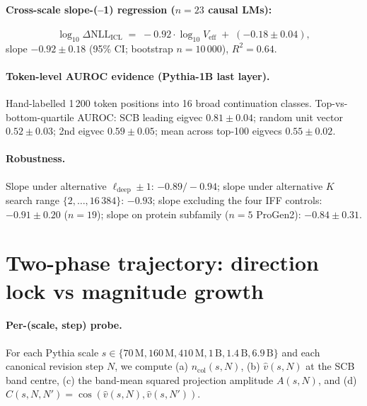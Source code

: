 \documentclass[11pt,a4paper]{article}
\begin{document}
\paragraph{Cross-scale slope-(--1) regression ($n = 23$ causal LMs):}
\begin{equation}
  \log_{10} \Delta\mathrm{NLL}_\mathrm{ICL}
  \;=\; -0.92 \cdot \log_{10} V_\mathrm{eff}
        \;+\; (-0.18 \pm 0.04),
\end{equation}
slope $-0.92 \pm 0.18$ (95\% CI; bootstrap $n = 10\,000$),
$R^2 = 0.64$.

\paragraph{Token-level AUROC evidence (Pythia-1B last layer).}
Hand-labelled 1\,200 token positions into 16 broad continuation
classes.  Top-vs-bottom-quartile AUROC:
SCB leading eigvec $0.81 \pm 0.04$;
random unit vector $0.52 \pm 0.03$;
2nd eigvec $0.59 \pm 0.05$;
mean across top-100 eigvecs $0.55 \pm 0.02$.

\paragraph{Robustness.}
Slope under alternative $\ell_\mathrm{deep} \pm 1$: $-0.89 / -0.94$;
slope under alternative $K$ search range $\{2, \ldots, 16\,384\}$:
$-0.93$; slope excluding the four IFF controls: $-0.91 \pm 0.20$
($n = 19$); slope on protein subfamily ($n = 5$ ProGen2):
$-0.84 \pm 0.31$.

\section{Two-phase trajectory: direction lock vs magnitude growth}
\label{si:S3}

\paragraph{Per-(scale, step) probe.}
For each Pythia scale $s \in \{70\,\mathrm{M}, 160\,\mathrm{M},
410\,\mathrm{M}, 1\,\mathrm{B}, 1.4\,\mathrm{B}, 6.9\,\mathrm{B}\}$
and each canonical revision step $N$, we compute (a)
$n_\mathrm{col}(s, N)$, (b) $\hat{v}(s, N)$ at the SCB band centre,
(c) the band-mean squared projection amplitude $A(s, N)$, and (d)
$C(s, N, N') = \cos(\hat{v}(s, N), \hat{v}(s, N'))$.
\end{document}
